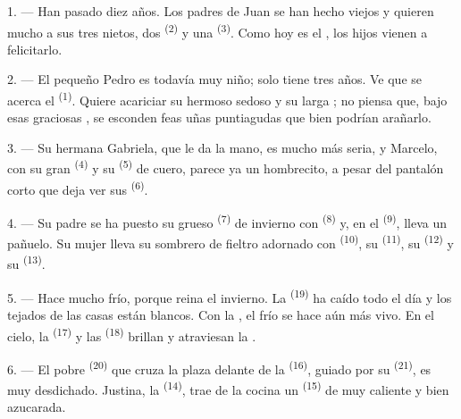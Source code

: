 \VUsaut{3.0mm}

1. --- Han pasado diez años. Los padres de Juan se han hecho viejos y
quieren mucho a sus tres nietos, dos  \textsuperscript{(2)} y una
 \textsuperscript{(3)}. Como hoy es el ,
los hijos vienen a felicitarlo.

2. --- El pequeño Pedro es todavía muy niño; solo tiene tres años. Ve que
se acerca el  \textsuperscript{(1)}. Quiere acariciar su hermoso
 sedoso y su larga ; no piensa que, bajo esas
graciosas , se esconden feas uñas puntiagudas que bien
podrían arañarlo.

3. --- Su hermana Gabriela, que le da la mano, es mucho más seria, y
Marcelo, con su gran  \textsuperscript{(4)} y su 
\textsuperscript{(5)} de cuero, parece ya un hombrecito, a pesar del pantalón
corto que deja ver sus  \textsuperscript{(6)}.

4. --- Su padre se ha puesto su grueso  \textsuperscript{(7)} de
invierno con  \textsuperscript{(8)} y, en el 
\textsuperscript{(9)}, lleva un pañuelo. Su mujer lleva su sombrero de fieltro
adornado con  \textsuperscript{(10)}, su 
\textsuperscript{(11)}, su  \textsuperscript{(12)} y su 
\textsuperscript{(13)}.

5. --- Hace mucho frío, porque reina el invierno. La 
\textsuperscript{(19)} ha caído todo el día y los tejados de las casas están
blancos. Con la , el frío se hace aún más vivo. En el cielo,
la  \textsuperscript{(17)} y las  \textsuperscript{(18)}
brillan y atraviesan la .

\VUsaut{4.2mm}
\VUsaut{3.0mm}

6. --- El pobre  \textsuperscript{(20)} que cruza la plaza delante de
la  \textsuperscript{(16)}, guiado por su 
\textsuperscript{(21)}, es muy desdichado. Justina, la 
\textsuperscript{(14)}, trae de la cocina un  \textsuperscript{(15)} de
 muy caliente y bien azucarada.

